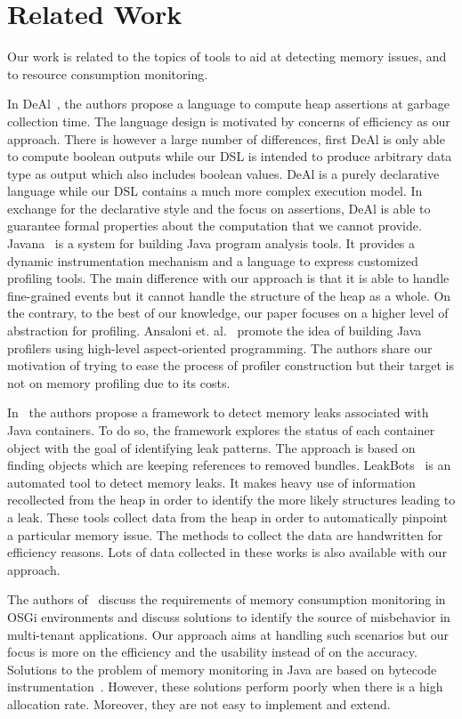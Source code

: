 \section{Related Work}\label{sec:relatedwork}
Our work is related to the topics of tools to aid at detecting memory issues, and to resource consumption monitoring.

In DeAl~\cite{Reichenbach:2010:GCE:1869459.1869482}, the authors propose a language to compute heap assertions at garbage collection time.
The language design is motivated by concerns of efficiency as our approach.
There is however a large number of differences, first DeAl is only able to compute boolean outputs while our DSL is intended to produce arbitrary data type as output which also includes boolean values.
DeAl is a purely declarative language while our DSL contains a much more complex execution model.
In exchange for the declarative style and the focus on assertions, DeAl is able to guarantee formal properties about the computation that we cannot provide. 
Javana~\cite{Maebe06javana:a} is a system for building Java program analysis tools. It provides a dynamic instrumentation mechanism and a language to express customized profiling tools.
The main difference with our
approach is that it is able to handle fine-grained events but it cannot handle the structure of the heap as a whole.
On the contrary, to the best of our knowledge, our paper focuses on a higher level of abstraction for profiling.
Ansaloni et. al.~\cite{Ansaloni:2010:RDE:1712605.1712616} promote the idea of building Java profilers using high-level aspect-oriented programming.
The authors share our motivation of trying to ease the process of profiler construction but their target is not on memory profiling due to its costs.

In~\cite{Xu:2013:PML:2491509.2491511} the authors propose a framework to detect memory leaks associated with Java containers.
To do so, the framework explores the status of each container object with the goal of identifying leak patterns. The approach is based on finding objects which are keeping references to removed bundles. LeakBots~\cite{Mitchell03leakbot:an} is an automated tool to detect memory leaks. It makes heavy
use of information recollected from the heap in order to identify the more likely structures leading to a leak.
These tools collect data from the heap in order to automatically pinpoint a particular memory issue.
The methods to collect the data are handwritten for efficiency reasons.
Lots of data collected in these works is also available with our approach.

The authors of~\cite{Attouchi:2014:MMM:2602458.2602467} discuss the requirements of memory consumption monitoring in OSGi environments and discuss solutions to identify the source of misbehavior in multi-tenant applications. Our approach aims at handling such scenarios but our focus is more on the efficiency and the usability instead of on the accuracy.
Solutions to the problem of memory monitoring in Java are based on bytecode instrumentation~\cite{binder_extending_2005, binder_portable_2001}.
However, these solutions perform poorly when there is a high allocation rate.
Moreover, they are not easy to implement and extend.

